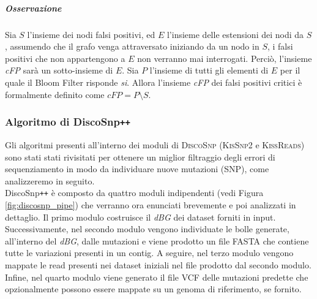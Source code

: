 \documentclass[../main.tex]{subfiles}
\begin{document}
\subparagraph{Osservazione} Sia $S$ l'insieme dei nodi falsi positivi, ed $E$ l'insieme delle estensioni dei nodi da $S$, assumendo che il grafo venga attraversato iniziando da un nodo in $S$, i falsi positivi che non appartengono a $E$ non verranno mai interrogati. Perciò, l'insieme \textit{cFP} sarà un sotto-insieme di $E$. Sia $P$ l'insieme di tutti gli elementi di $E$ per il quale il Bloom Filter risponde \textit{si}. Allora l'insieme \textit{cFP} dei falsi positivi critici è formalmente definito come $cFP = P \setminus S$.

\subsubsection{Algoritmo di DiscoSnp\texttt{++}}
Gli algoritmi presenti all'interno dei moduli di \textsc{DiscoSnp} (\textsc{KisSnp2} e \textsc{KissReads}) sono stati stati rivisitati per ottenere un miglior filtraggio degli errori di sequenziamento in modo da individuare nuove mutazioni (SNP), come analizzeremo in seguito.\\

\noindent
DiscoSnp\texttt{++} è composto da quattro moduli indipendenti (vedi Figura \ref{fig:discosnp_pipe}) che verranno ora enunciati brevemente e poi analizzati in dettaglio. Il primo modulo costruisce il \textit{dBG} dei dataset forniti in input. Successivamente, nel secondo modulo vengono individuate le bolle generate, all'interno del \textit{dBG}, dalle mutazioni e viene prodotto un file FASTA che contiene tutte le variazioni presenti in un contig. A seguire, nel terzo modulo vengono mappate le read presenti nei dataset iniziali nel file prodotto dal secondo modulo. Infine, nel quarto modulo viene generato il file VCF delle mutazioni predette che opzionalmente possono essere mappate su un genoma di riferimento, se fornito.
\end{document}
